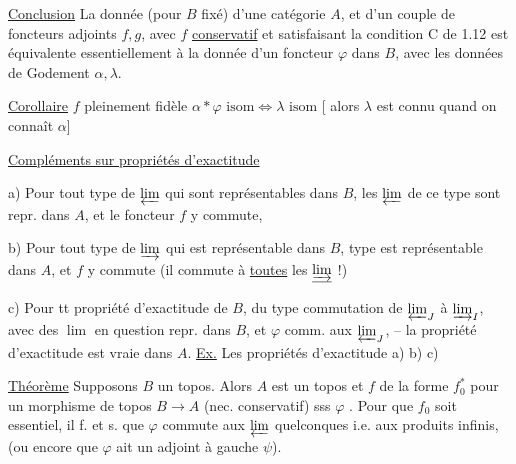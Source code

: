 \uline{Conclusion} La donnée (pour $B$ fixé) d'une catégorie $A$, et d'un couple de foncteurs adjoints $f,g$,
avec $f$ \uline{conservatif} et   satisfaisant la condition C de 1.12 est équivalente essentiellement à la donnée d'un foncteur $\varphi$ dans $B$, avec les données de Godement $\alpha,\lambda$.


\uline{Corollaire} $f$ pleinement fidèle \deleted{\unsure{\Longleftrightarrow}}\quad
$\alpha*\varphi\text{ isom}\Longleftrightarrow\lambda\text{ isom}$ [ alors $\lambda$ est connu quand on connaît $\alpha$]

\uline{Compléments sur propriétés d'exactitude}

a) Pour tout type de $\varprojlim$ qui sont représentables dans $B$,  les $\varprojlim$ de ce type  sont repr. dans $A$, et le foncteur $f$ y commute, 

b) Pour tout type de $\varinjlim$ qui est représentable dans $B$,  \unsure{\textquotedbl} type est représentable dans $A$, et $f$ y commute (il commute \textquotedbl à \uline{toutes} les $\underline{\varinjlim}$ !)

c) Pour tt propriété d'exactitude de $B$,  du type commutation de $\varprojlim_J$  à $\varinjlim_I$, avec des  $\lim$ en question repr. dans $B$, et $\varphi$ comm. aux $\varprojlim_J$, -- la \textquotedbl propriété d'exactitude est vraie dans $A$. \uline{Ex.} Les propriétés d'exactitude a) b) c)

\uline{Théorème} Supposons $B$ un topos. Alors $A$ est un topos et $f$ de la forme $f_0^*$ pour un morphisme de topos $B\longrightarrow A$ (nec. conservatif) sss $\varphi$  . Pour que $f_0$ soit essentiel, il f. et s. que $\varphi$ commute aux $\varprojlim$ quelconques i.e. aux produits infinis, (ou encore que $\varphi$ ait un adjoint à gauche $\psi$).
